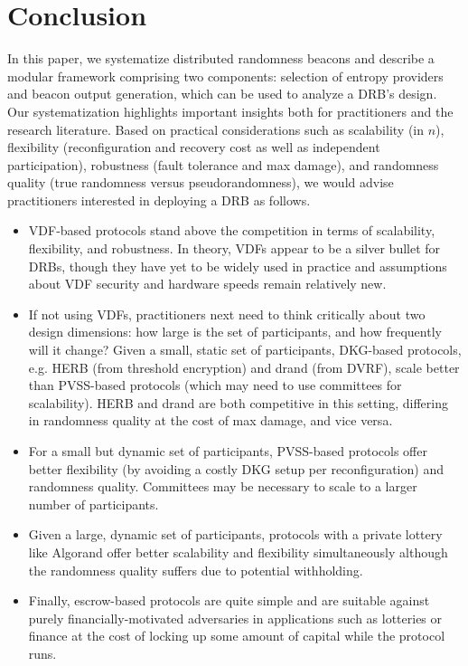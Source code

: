\documentclass[conference]{IEEEtran}
\theoremstyle{definition}
\theoremstyle{remark}
\begin{document}
\section{Conclusion}
\label{section:conclusion}
In this paper, we systematize distributed randomness beacons and describe a modular framework comprising two components: selection of entropy providers and beacon output generation, which can be used to analyze a DRB's design.
Our systematization highlights important insights both for practitioners and the research literature. Based on practical considerations such as scalability (in $n$), flexibility (reconfiguration and recovery cost as well as independent participation), robustness (fault tolerance and max damage), and randomness quality (true randomness versus pseudorandomness), we would advise practitioners interested in deploying a DRB as follows.
\begin{itemize}
    \item VDF-based protocols stand above the competition in terms of scalability, flexibility, and robustness. In theory, VDFs appear to be a silver bullet for DRBs, though they have yet to be widely used in practice and assumptions about VDF security and hardware speeds remain relatively new.
    \item If not using VDFs, practitioners next need to think critically about two design dimensions: how large is the set of participants, and how frequently will it change? Given a small, static set of participants, DKG-based protocols, e.g. HERB (from threshold encryption) and drand (from DVRF), scale better than PVSS-based protocols (which may need to use committees for scalability). HERB and drand are both competitive in this setting, differing in randomness quality at the cost of max damage, and vice versa.
    \item For a small but dynamic set of participants, PVSS-based protocols offer better flexibility (by avoiding a costly DKG setup per reconfiguration) and randomness quality. Committees may be necessary to scale to a larger number of participants.
    \item Given a large, dynamic set of participants, protocols with a private lottery like Algorand offer better scalability and flexibility simultaneously although the randomness quality suffers due to potential withholding.
    \item Finally, escrow-based protocols are quite simple and are suitable against purely financially-motivated adversaries in applications such as lotteries or finance at the cost of locking up some amount of capital while the protocol runs.
\end{itemize}
\end{document}
